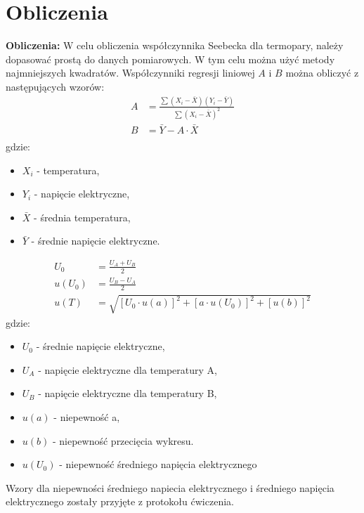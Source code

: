 \documentclass[11pt]{article}
\begin{document}
\section*{Obliczenia}
\textbf{Obliczenia:} W celu obliczenia współczynnika Seebecka dla termopary, należy dopasować prostą do danych pomiarowych. 
W tym celu można użyć metody najmniejszych kwadratów. Współczynniki regresji liniowej \( A \) i \( B \) można obliczyć z następujących wzorów:
\begin{align*}
A &= \frac{\sum (X_i - \bar{X})(Y_i - \bar{Y})}{\sum (X_i - \bar{X})^2} \\
B &= \bar{Y} - A \cdot \bar{X} \\
\end{align*}
gdzie:
\begin{itemize}
    \item \( X_i \) - temperatura,
    \item \( Y_i \) - napięcie elektryczne,
    \item \( \bar{X} \) - średnia temperatura,
    \item \( \bar{Y} \) - średnie napięcie elektryczne.
\end{itemize}


\begin{align*}
U_0 &= \frac{U_A + U_B}{2} \\
u(U_0) &= \frac{U_B - U_A}{2} \\
u(T) &= \sqrt{[U_0 \cdot u(a)]^2 + [a \cdot u(U_0)]^2 + [u(b)]^2}
\end{align*}
gdzie:
\begin{itemize}
    \item \( U_0 \) - średnie napięcie elektryczne,
    \item \( U_A \) - napięcie elektryczne dla temperatury A,
    \item \( U_B \) - napięcie elektryczne dla temperatury B,
    \item \( u(a) \) - niepewność a,
    \item \( u(b) \) - niepewność przecięcia wykresu.
    \item \( u(U_0) \) - niepewność średniego napięcia elektrycznego
\end{itemize}
Wzory dla niepewności średniego napiecia elektrycznego i średniego napięcia elektrycznego zostały przyjęte z protokołu ćwiczenia.
\end{document}
